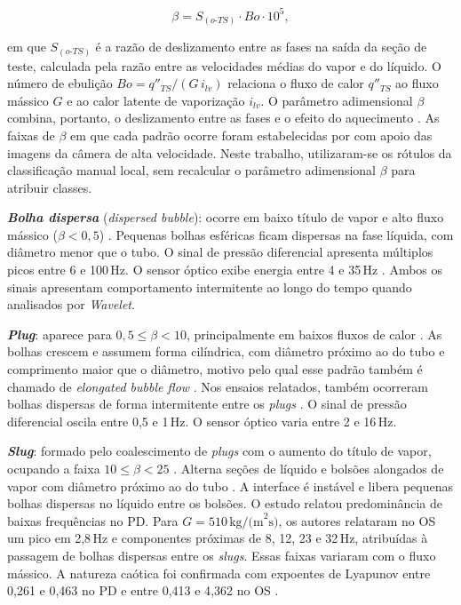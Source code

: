 \begin{equation}\label{eq:beta}
  \beta = S_{(o\text{-}TS)} \cdot Bo \cdot 10^5,
\end{equation}

\noindent
em que $S_{(o\text{-}TS)}$ é a razão de deslizamento entre as fases na saída da seção de
teste, calculada pela razão entre as velocidades médias do vapor e do líquido.
O número de ebulição $Bo = q''_{TS}/(G\,i_{lv})$ relaciona o fluxo de calor
$q''_{TS}$ ao fluxo mássico $G$ e ao calor latente de vaporização $i_{lv}$.
O parâmetro adimensional $\beta$ combina, portanto, o deslizamento entre as
fases e o efeito do aquecimento \cite{deoliveira2021}. As faixas de $\beta$ em que cada padrão
ocorre foram estabelecidas por  com apoio das imagens da
câmera de alta velocidade. Neste trabalho, utilizaram-se os rótulos da classificação
manual local, sem recalcular o parâmetro adimensional $\beta$ para atribuir classes.

\textbf{\textit{Bolha dispersa}} (\textit{dispersed bubble}): ocorre em baixo título de vapor e
alto fluxo mássico ($\beta < 0{,}5$)
\cite{deoliveira2021}. Pequenas bolhas esféricas ficam dispersas na fase líquida, com
diâmetro menor que o tubo. O sinal de pressão diferencial apresenta múltiplos picos entre 6 e
100\,Hz. O sensor óptico exibe energia entre 4 e 35\,Hz \cite{deoliveira2021}. Ambos os
sinais apresentam comportamento intermitente ao longo do tempo quando analisados por
\textit{Wavelet}.

\textbf{\textit{Plug}}: aparece para $0{,}5 \leq \beta < 10$, principalmente em baixos
fluxos de calor \cite{deoliveira2021}. As bolhas crescem e assumem forma cilíndrica, com
diâmetro próximo ao do tubo e comprimento maior que o diâmetro, motivo pelo qual esse padrão
também é chamado de \textit{elongated bubble flow} \cite{deoliveira2021}.
Nos ensaios relatados, também ocorreram bolhas dispersas de forma intermitente
entre os \textit{plugs} \cite{deoliveira2021}.
O sinal de pressão diferencial oscila entre 0{,}5 e 1\,Hz. O sensor óptico varia entre 2 e 16\,Hz.

\textbf{\textit{Slug}}: formado pelo coalescimento de \textit{plugs} com o aumento do título de
vapor, ocupando a faixa $10 \leq \beta < 25$ \cite{deoliveira2021}. Alterna seções de
líquido e bolsões alongados de vapor com diâmetro próximo ao do tubo
\cite{dias2025knn,deoliveira2021}. A interface é instável e libera
pequenas bolhas dispersas no líquido entre os bolsões. O estudo relatou predominância
de baixas frequências no PD. Para $G=510\,\text{kg/(m}^2\text{s)}$, os autores
relataram no OS um pico em 2{,}8\,Hz e componentes próximas de 8, 12, 23 e 32\,Hz,
atribuídas à passagem de bolhas dispersas entre os \textit{slugs}. Essas faixas
variaram com o fluxo mássico.
A natureza caótica foi confirmada com expoentes de Lyapunov entre 0{,}261
e 0{,}463 no PD e entre 0{,}413 e 4{,}362 no OS \cite{deoliveira2021}.

